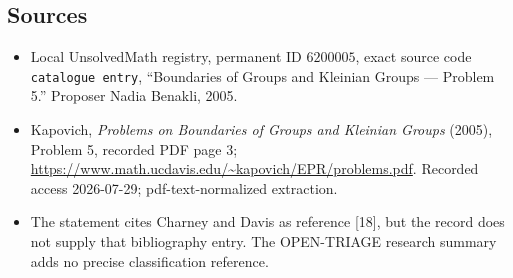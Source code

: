 \documentclass[11pt]{article}
\begin{document}
\subsection{Sources}
\begin{itemize}
\item Local UnsolvedMath registry, permanent ID \(6200005\), exact source code \texttt{catalogue entry}, ``Boundaries of Groups and Kleinian Groups --- Problem 5.'' Proposer Nadia Benakli, 2005.
\item Kapovich, \emph{Problems on Boundaries of Groups and Kleinian Groups} (2005), Problem 5, recorded PDF page 3; \url{https://www.math.ucdavis.edu/~kapovich/EPR/problems.pdf}. Recorded access 2026-07-29; pdf-text-normalized extraction.
\item The statement cites Charney and Davis as reference [18], but the record does not supply that bibliography entry. The OPEN-TRIAGE research summary adds no precise classification reference.
\end{itemize}
\end{document}

